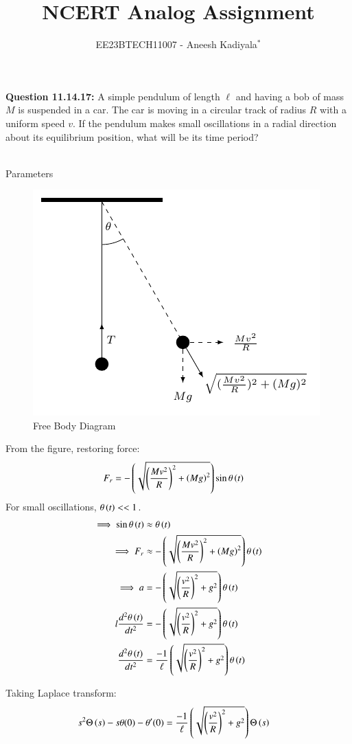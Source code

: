 \documentclass[journal,12pt,twocolumn]{IEEEtran}
\theoremstyle{remark}
\begin{document}

\vspace{3cm}

\title{NCERT Analog Assignment}
\author{EE23BTECH11007 - Aneesh Kadiyala$^{*}$%
}
\maketitle
\newpage
\bigskip

\renewcommand{\thefigure}{\theenumi}
\renewcommand{\thetable}{\theenumi}

\vspace{3cm}
\textbf{Question 11.14.17:} A simple pendulum of length $\ell$ and having a bob of mass $M$ is suspended in a car. The car is moving in a circular track of radius $R$ with a uniform speed $v$. If the pendulum makes small oscillations in a radial direction about its equilibrium position, what will be its time period?
\\
\solution
\\
\begin{table}[h!]
    \centering
    \caption{Parameters}
    \label{tab:1}
    
\end{table}
\begin{figure}[h!]
\centering
\includegraphics{figs/fbd.pdf}
\caption{Free Body Diagram}
\label{fig:1}
\end{figure}

From the figure, restoring force:
\begin{align}
F_r &= -\left(\sqrt{\left(\frac{Mv^2}{R}\right)^2+\left(Mg\right)^2}\right)\sin{\theta\ensuremath{\left(t\right)}}
\end{align}
For small oscillations, $\theta\left(t\right) << 1$.
\begin{align}
\implies \sin{\theta\ensuremath{\left(t\right)}} &\approx \theta\left(t\right) \\
\implies F_r &\approx -\left(\sqrt{\left(\frac{Mv^2}{R}\right)^2+\left(Mg\right)^2}\right)\theta\left(t\right) \\
\implies a &= -\left(\sqrt{\left(\frac{v^2}{R}\right)^2+g^2}\right)\theta\left(t\right) \\
l\frac{d^2\theta\left(t\right)}{dt^2} &= -\left(\sqrt{\left(\frac{v^2}{R}\right)^2+g^2}\right)\theta\left(t\right) \\
\frac{d^2\theta\left(t\right)}{dt^2} &= \frac{-1}{\ell}\left(\sqrt{\left(\frac{v^2}{R}\right)^2+g^2}\right)\theta\left(t\right) \\
\end{align}

Taking Laplace transform:
\begin{align}
s^2\Theta\left(s\right) - s\theta(0) - \theta'(0) &= \frac{-1}{\ell}\left(\sqrt{\left(\frac{v^2}{R}\right)^2+g^2}\right)\Theta\left(s\right)
\end{align}
\end{document}
